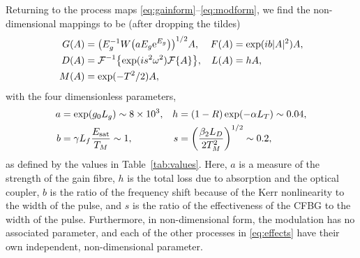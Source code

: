 \documentclass[9pt,twocolumn,twoside]{osajnl}
\let\originalleft\left
\let\originalright\right
\renewcommand{\left}{\mathopen{}\mathclose\bgroup\originalleft}
\renewcommand{\right}{\aftergroup\egroup\originalright}
\newcommand{\Es}{E_{\textrm{sat}}} %
\newcommand{\FT}[1]{\mathcal{F}\left\{ #1 \right\}} %
\newcommand{\FTi}[1]{\mathcal{F}^{-1}\left\{ #1 \right\}} %
\begin{document}
Returning to the process maps \eqref{eq:gainform}--\eqref{eq:modform}, we find the non-dimensional mappings to be (after dropping the tildes)
\begin{align}
	G(A) &= \left(E_g^{-1} W \left( a E_g \textrm{e}^{E_g}\right) \right)^{1/2} A, & F(A) &= \exp( i b |A|^2) A, \nonumber \\
	D(A) &= \FTi{\exp( i s^2 \omega^2 ) \FT{A}}, & L(A) &= h A, \label{eq:effects} \\
	M(A) &= \exp( -T^2 / 2 ) A, \nonumber
\end{align}
with the four dimensionless parameters,
\begin{equation}
	\begin{aligned}
		a &= \exp( g_0 L_g ) \sim 8 \times 10^3, & 
		h &= (1 - R) \exp( - \alpha L_T) \sim 0.04, \\
		b &= \gamma L_f \frac{\Es}{T_M} \sim 1, & s &= \left( \frac{\beta_2 L_D}{2 T_M^2} \right)^{1/2} \sim 0.2,
		\label{eq:ndparam}
	\end{aligned}
\end{equation}
as defined by the values in Table~\ref{tab:values}. Here, $a$ is a measure of the strength of the gain fibre, $h$ is the total loss due to absorption and the optical coupler, $b$ is the ratio of the frequency shift because of the Kerr nonlinearity to the width of the pulse, and $s$ is the ratio of the effectiveness of the CFBG to the width of the pulse. Furthermore, in non-dimensional form, the modulation has no associated parameter, and each of the other processes in \eqref{eq:effects} have their own independent, non-dimensional parameter.
\end{document}
